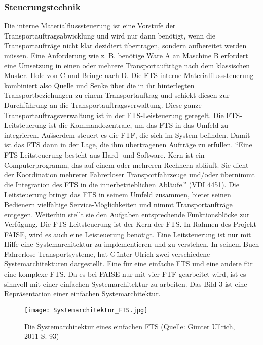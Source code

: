 \subsubsection{Steuerungstechnik}
Die interne Materialflusssteuerung ist eine Vorstufe der Transportauftragsabwicklung und wird nur dann ben\"otigt, wenn die Transportauftr\"age nicht klar dezidiert \"ubertragen, sondern aufbereitet werden m\"ussen. Eine Anforderung wie z. B. ben\"otige Ware A an Maschine B erfordert eine Umsetzung in einen oder mehrere Transportauftr\"age nach dem klassischen Muster. Hole von C und Bringe nach D. Die FTS-interne Materialflusssteuerung kombiniert also Quelle und Senke \"uber die in ihr hinterlegten Transportbeziehungen zu einem Transportauftrag und schickt diesen zur Durchf\"uhrung an die Transportauftragsverwaltung. Diese ganze Transportauftragsverwaltung ist in der FTS-Leisteuerung geregelt. 
Die FTS-Leitsteuerung ist die Kommandozentrale, um das FTS in das Umfeld zu integrieren. Au\"sserdem steuert es die FTF, die sich im System befinden. Damit ist das FTS dann in der 
Lage, die ihm \"ubertragenen Auftr\"age zu erf\"ullen. "`Eine FTS-Leitsteuerung besteht aus Hard- und Software. Kern ist ein Computerprogramm, das auf einem oder mehreren Rechnern abl\"auft. Sie dient der Koordination mehrerer Fahrerloser Transportfahrzeuge und/oder \"ubernimmt die Integration des FTS in die innerbetrieblichen Abl\"aufe."' (VDI 4451). Die Leitsteuerung bringt das FTS in seinem Umfeld zusammen, bietet seinen Bedienern vielf\"altige Service-M\"oglichkeiten und nimmt Transportauftr\"age entgegen. Weiterhin stellt sie den Aufgaben entsprechende Funktionsbl\"ocke zur Verf\"ugung. 
Die FTS-Leitsteuerung ist der Kern der FTS. In Rahmen des Projekt FAISE, wird es auch eine Leisteuerung ben\"otigt. Eine Leitsteuerung ist nur mit Hilfe eine Systemarchitektur zu implementieren und zu verstehen. In seinem Buch Fahrerlose Transportsysteme, hat G\"unter Ulrich zwei verschiedene Systemarchitekturen dargestellt. Eine f\"ur eine einfache FTS und eine andere f\"ur eine komplexe FTS. Da es bei FAISE nur mit vier FTF gearbeitet wird, ist es sinnvoll mit einer einfachen Systemarchitektur zu arbeiten. Das Bild 3 ist eine Repr\"asentation einer einfachen Systemarchitektur.
	\begin{figure}[h!]
		\centering
		\texttt{[image: Systemarchitektur\_FTS.jpg]}
		\caption{Die Systemarchitektur eines einfachen FTS (Quelle: G\"unter Ullrich, 2011 S. 93)}
		\label{Systemarchitektur_FTS}
	\end{figure}

